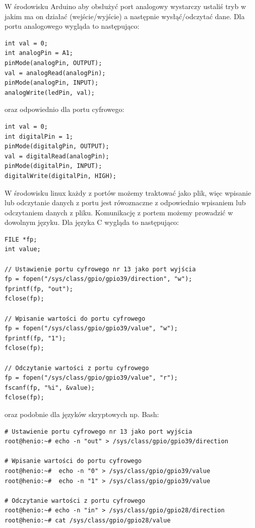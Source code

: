 \documentclass{xmgr}
\begin{document}
W środowisku Arduino aby obsłużyć port analogowy wystarczy ustaliś tryb w jakim ma on działać (wejście/wyjście) a następnie wysłąć/odczytać dane. Dla portu analogowego wygląda to następująco:
\begin{lstlisting}[label=bot-dirs-alg,caption=Obsługa portu analogowego w środowisku Arduino]
int val = 0;
int analogPin = A1;	
pinMode(analogPin, OUTPUT);
val = analogRead(analogPin);
pinMode(analogPin, INPUT);
analogWrite(ledPin, val);
\end{lstlisting}

oraz odpowiednio dla portu cyfrowego:
\begin{lstlisting}[label=bot-dirs-alg,caption=Obsługa portu cyfrowego w środowisku Arduino]
int val = 0;
int digitalPin = 1;	
pinMode(digitalgPin, OUTPUT);
val = digitalRead(analogPin);
pinMode(digitalPin, INPUT);
digitalWrite(digitalPin, HIGH);
\end{lstlisting}

W środowisku linux każdy z portów możemy traktować jako plik, więc wpisanie lub odczytanie danych z portu jest rówoznaczne z odpowiednio wpisaniem lub odczytaniem danych z pliku. Komunikację z portem możemy prowadzić w dowolnym języku. Dla języka C wygląda to następująco:

\begin{lstlisting}[label=bot-dirs-alg,caption=Obsługa portu cyfrowego w środowisku Linux (język C)]
FILE *fp;
int value;

// Ustawienie portu cyfrowego nr 13 jako port wyjścia
fp = fopen("/sys/class/gpio/gpio39/direction", "w");
fprintf(fp, "out");
fclose(fp);

// Wpisanie wartości do portu cyfrowego
fp = fopen("/sys/class/gpio/gpio39/value", "w");
fprintf(fp, "1");
fclose(fp);

// Odczytanie wartości z portu cyfrowego
fp = fopen("/sys/class/gpio/gpio39/value", "r");
fscanf(fp, "%i", &value);
fclose(fp);
\end{lstlisting}

oraz podobnie dla języków skryptowych np. Bash:

\begin{lstlisting}[label=bot-dirs-alg,caption=Obsługa portu cyfrowego w środowisku Linux (bash)]
# Ustawienie portu cyfrowego nr 13 jako port wyjścia
root@henio:~# echo -n "out" > /sys/class/gpio/gpio39/direction

# Wpisanie wartości do portu cyfrowego
root@henio:~#  echo -n "0" > /sys/class/gpio/gpio39/value
root@henio:~#  echo -n "1" > /sys/class/gpio/gpio39/value

# Odczytanie wartości z portu cyfrowego
root@henio:~# echo -n "in" > /sys/class/gpio/gpio28/direction
root@henio:~# cat /sys/class/gpio/gpio28/value
\end{lstlisting}
\end{document}
